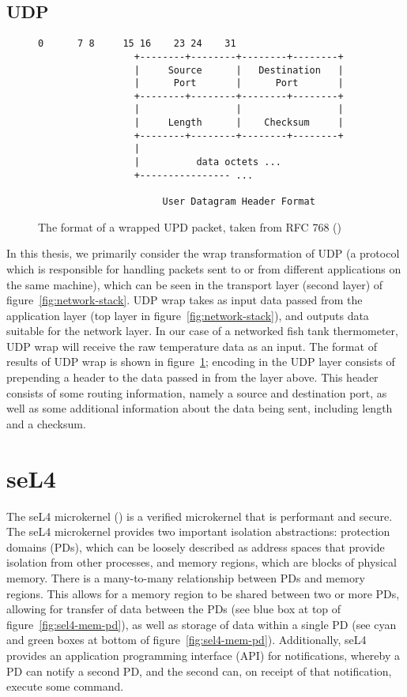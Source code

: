 \documentclass[twoside]{memoir}
\begin{document}
\subsection{UDP}
\begin{figure}[htb]
    \centering
\begin{lstlisting}[language=file]
                  0      7 8     15 16    23 24    31
                 +--------+--------+--------+--------+
                 |     Source      |   Destination   |
                 |      Port       |      Port       |
                 +--------+--------+--------+--------+
                 |                 |                 |
                 |     Length      |    Checksum     |
                 +--------+--------+--------+--------+
                 |
                 |          data octets ...
                 +---------------- ...

                      User Datagram Header Format
\end{lstlisting}
    \caption{The format of a wrapped UPD packet, taken from RFC 768 (\cite{rfc768})}
    \label{fig:udp-wrap-rfc}
\end{figure}
In this thesis, we primarily consider
the wrap transformation of UDP (a protocol which is responsible for
handling packets sent to or from different applications on the same machine),
which can be seen in the transport layer (second layer) of
figure~\ref{fig:network-stack}.
UDP wrap takes as input data passed from the application layer (top layer in figure~\ref{fig:network-stack}), and outputs data suitable for the network layer.
In our case of a networked fish tank thermometer, UDP wrap will receive the raw temperature data as an input.
The format of results of UDP wrap is shown in figure~\ref{fig:udp-wrap-rfc};
encoding in the UDP layer consists of prepending a header
to the data passed in from the layer above.
This header consists of some routing information, namely a source and
destination port, as well as some additional information about the
data being sent, including length and a checksum.



\section{seL4}
The seL4 microkernel (\cite{Klein2014Verification}) is a verified microkernel
that is performant and secure.
The seL4 microkernel provides two important isolation abstractions:
protection domains (PDs),
which can be loosely described as address spaces that provide isolation from
other processes,
and memory regions, which are blocks of physical memory.
There is a many-to-many relationship between PDs and memory regions.
This allows for a memory region to be shared between two or more PDs,
allowing for transfer of data between the PDs
(see blue box at top of figure~\ref{fig:sel4-mem-pd}),
as well as storage of data within
a single PD
(see cyan and green boxes at bottom of figure~\ref{fig:sel4-mem-pd}).
Additionally, seL4 provides an application programming interface (API) for notifications,
whereby a PD can notify a second PD, and the second can,
on receipt of that notification, execute some command.
\end{document}
